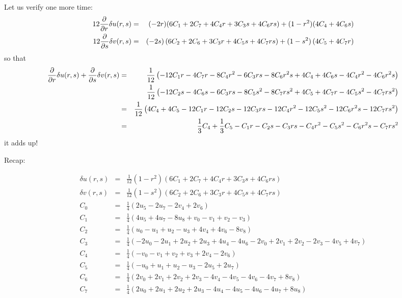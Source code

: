 Let us verify one more time:
\begin{eqnarray}
12\frac{\partial}{\partial r} \delta u(r,s) 
&=& (-2r) ( 6C_1 + 2C_7 + 4C_4 r+ 3C_3s + 4C_6 rs   )
+  (1-r^2) ( 4C_4 + 4C_6 s   )\nonumber \\
12\frac{\partial}{\partial s} \delta v(r,s) 
&=&  (-2s) \left(6 C_2 + 2 C_6 + 3 C_3 r + 4 C_5s + 4 C_7 rs \right)
+ 
 (1-s^2) \left(4 C_5 + 4 C_7 r \right) \nonumber
\end{eqnarray}
so that
\begin{eqnarray}
\frac{\partial}{\partial r} \delta u(r,s) 
+\frac{\partial}{\partial s} \delta v(r,s) 
&=&\frac{1}{12}\left( -12C_1 r -4 C_7r -8C_4r^2 -6C_3rs -8C_6 r^2s 
+4C_4 + 4C_6s-4C_4r^2 - 4C_6 r^2s \right) \nonumber\\
&&\frac{1}{12}\left( -12C_2s -4C_6s -6C_3rs -8C_5 s^2 -8C_7rs^2
+4C_5 + 4C_7r-4C_5s^2 -4C_7 rs^2 \right)\nonumber\\
&=&\frac{1}{12}\left( 4C_4 + 4C_5  -12C_1r -12C_2s  -12C_3 rs -12C_4 r^2 -12C_5 s^2
-12C_6 r^2s -12 C_7rs^2  \right) \nonumber\\
&=& \frac13 C_4 + \frac13 C_5  -C_1r -C_2s  -C_3 rs -C_4 r^2 -C_5 s^2
-C_6 r^2s - C_7rs^2 \nonumber
\end{eqnarray}
it adds up!

\newpage
Recap:

\begin{mdframed}[backgroundcolor=blue!5]
\begin{eqnarray}
\delta u(r,s) 
&=& \frac{1}{12} (1-r^2) ( 6C_1 + 2C_7 + 4C_4 r+ 3C_3s + 4C_6 rs   ) \nonumber\\
\delta v(r,s) 
&=& \frac{1}{12} (1-s^2) \left(6 C_2 + 2 C_6 + 3 C_3 r + 4 C_5s + 4 C_7 rs \right) \nonumber\\
C_0 &=& \frac{1}{4}(2u_5 -2u_7 -2v_4 +2v_6)  \nonumber\\ 
C_1 &=& \frac{1}{4}( 4u_5 +4u_7 -8u_8 +v_0 -v_1 +v_2 -v_3  ) \nonumber\\ 
C_2 &=& \frac{1}{4}( u_0 -u_1 +u_2 -u_3 +4v_4 +4v_6 -8v_8  ) \nonumber\\
C_3 &=& \frac{1}{4}(  -2u_0 -2u_1 +2u_2 +2u_3 +4u_4 -4u_6 -2v_0 +2v_1 +2v_2 -2v_3 -4v_5 +4v_7  )   \nonumber \\ 
C_4 &=& \frac{1}{4}(-v_0 -v_1 +v_2 +v_3 +2v_4 -2v_6 )           \nonumber \\ 
C_5 &=& \frac{1}{4}(-u_0 + u_1 +u_2 -u_3 -2u_5 +2u_7   )           \nonumber \\ 
C_6 &=& \frac{1}{4}(  2v_0 +2v_1 +2v_2 +2v_3 -4v_4 -4v_5 -4v_6 -4v_7 +8v_8)     \nonumber   \\ 
C_7 &=& \frac{1}{4}(  2u_0 +2u_1 +2u_2 +2u_3 -4u_4 -4u_5 -4u_6 -4u_7 +8u_8  )     \nonumber 
\end{eqnarray}
\end{mdframed}

